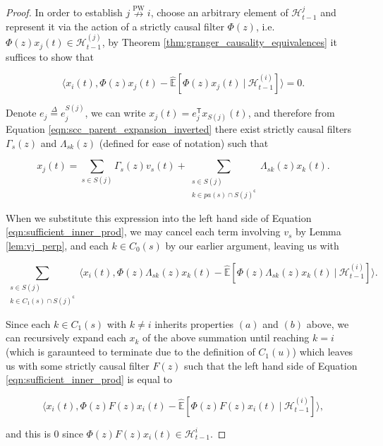 \documentclass{statsoc}
\def\npwgc{\overset{\text{PW}}{\nrightarrow}}  %
\def\H{\mathcal{H}}  %
\newcommand{\linE}[2]{\hat{\E}[#1\ |\ #2]}  %
\newcommand{\pa}[1]{pa(#1)}  %
\def\defeq{\overset{\Delta}{=}}  %
\def\H{\mathcal{H}}  %
\def\E{\mathbb{E}}  %
\def\T{\mathsf{T}}  %
\def\c{\mathsf{c}}  %
\newcommand{\inner}[2]{\langle #1, #2 \rangle}  %
\begin{document}
\begin{proof}
  In order to establish $j \npwgc i$, choose an arbitrary element of
  $\H_{t - 1}^j$ and represent it via the action of a strictly causal
  filter $\Phi(z)$, i.e.  $\Phi(z) x_j(t) \in \H_{t - 1}^{(j)}$, by
  Theorem \ref{thm:granger_causality_equivalences} it suffices to show
  that

  \begin{equation}
    \label{eqn:sufficient_inner_prod}
    \inner{x_i(t)}{\Phi(z)x_j(t) - \linE{\Phi(z)x_j(t)}{\H_{t - 1}^{(i)}}} = 0.
  \end{equation}

  Denote $e_j \defeq e_j^{S(j)}$, we can write
  $x_j(t) = e_j^\T x_{S(j)}(t)$, and therefore from Equation
  \eqref{eqn:scc_parent_expansion_inverted} there exist strictly
  causal filters $\Gamma_s(z)$ and $\Lambda_{sk}(z)$ (defined for ease
  of notation) such that

  \[
    x_j(t) = \sum_{s \in S(j)} \Gamma_s(z)v_s(t) + \sum_{\substack{s \in S(j) \\ k \in \pa{s} \cap S(j)^\c}} \Lambda_{sk}(z)x_k(t).
  \]

  When we substitute this expression into the left hand side of
  Equation \eqref{eqn:sufficient_inner_prod}, we may cancel each term
  involving $v_s$ by Lemma \ref{lem:vj_perp}, and each $k \in C_0(s)$
  by our earlier argument, leaving us with

  \[
    \sum_{\substack{s \in S(j) \\ k \in C_1(s) \cap S(j)^\c}}\inner{x_i(t)}{\Phi(z)\Lambda_{sk}(z)x_k(t) - \linE{\Phi(z)\Lambda_{sk}(z)x_k(t)}{\H_{t - 1}^{(i)}}}.
  \]

  Since each $k \in C_1(s)$ with $k \ne i$ inherits properties $(a)$
  and $(b)$ above, we can recursively expand each $x_k$ of the above
  summation until reaching $k = i$ (which is garaunteed to terminate
  due to the definition of $C_1(u)$) which leaves us with some
  strictly causal filter $F(z)$ such that the left hand side of
  Equation \eqref{eqn:sufficient_inner_prod} is equal to

  \[
    \inner{x_i(t)}{\Phi(z)F(z)x_i(t) - \linE{\Phi(z)F(z)x_i(t)}{\H_{t - 1}^{(i)}}},
  \]

  and this is $0$ since $\Phi(z)F(z)x_i(t) \in \H_{t - 1}^i$.
  



\end{proof}
\end{document}
